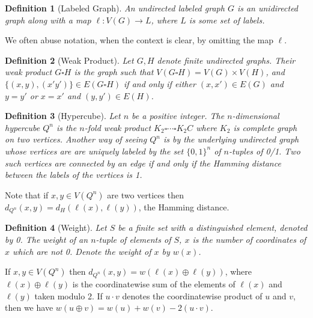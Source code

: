 \documentclass{article}
\newtheorem{definition}{Definition}
\begin{document}
\begin{definition}[Labeled Graph]
  An undirected \emph{labeled graph} $G$ is an unidirected graph along
  with a map $\ell: V(G) \rightarrow L$, where $L$ is some set of
  labels.
\end{definition}
We often abuse notation, when the context is clear, by omitting the
map $\ell$.
\begin{definition}[Weak Product]
Let $G, H$ denote finite undirected graphs.  Their \emph{weak product}
$G \square H$ is the graph such that $V(G \square H) = V(G) \times V(H)$,
and $\{(x,y),(x'y')\} \in E(G \square H)$ if and only if either $(x,x')
\in E(G)$ and $y=y'$ or $x=x'$ and $(y,y') \in E(H)$.
\end{definition}
\begin{definition}[Hypercube]
  Let $n$ be a positive integer. The $n$-dimensional \emph{hypercube}
  $Q^n$ is the $n$-fold weak product $K_2 \square \cdots \square K_2C$
  where $K_2$ is complete graph on two vertices.  Another way of
  seeing $Q^n$ is by the underlying undirected graph whose vertices
  are are uniquely labeled by the set $\{0,1\}^n$ of $n$-tuples of
  0/1.  Two such vertices are connected by an edge if and only if the
  Hamming distance between the labels of the vertices is 1.
\end{definition}
Note that if $x,y \in V(Q^n)$ are two vertices then $d_{Q^n}(x,y) =
d_H(\ell(x),\ell(y))$, the Hamming distance.
\begin{definition}[Weight]
  Let $S$ be a finite set with a distinguished element, denoted by 0.
  The \emph{weight} of an $n$-tuple of elements of $S$, $x$ is the number
  of coordinates of $x$ which are not 0.  Denote the weight of $x$ by $w(x)$.
\end{definition}

If $x,y \in V(Q^n)$ then $d_{Q^n}(x,y) = w(\ell(x) \oplus \ell(y))$, where $\ell(x)
\oplus \ell(y)$ is the coordinatewise sum of the elements of $\ell(x)$ and $\ell(y)$
taken modulo 2.  If $u \cdot v$ denotes the coordinatewise product of $u$
and $v$, then we have $w(u \oplus v) = w(u) + w(v) - 2 (u \cdot v)$.
\end{document}
